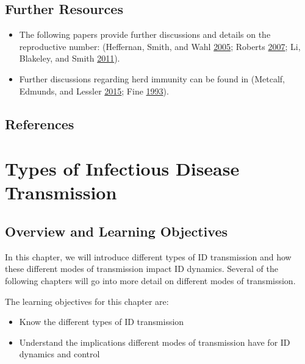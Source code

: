 \documentclass[]{book}
\providecommand{\tightlist}{%
  \setlength{\itemsep}{0pt}\setlength{\parskip}{0pt}}
\theoremstyle{definition}
\theoremstyle{definition}
\theoremstyle{definition}
\theoremstyle{remark}
\begin{document}
\hypertarget{further-resources-1}{%
\section{Further Resources}\label{further-resources-1}}

\begin{itemize}
\tightlist
\item
  The following papers provide further discussions and details on the
  reproductive number: (Heffernan, Smith, and Wahl
  \protect\hyperlink{ref-heffernan05}{2005}; Roberts
  \protect\hyperlink{ref-roberts07}{2007}; Li, Blakeley, and Smith
  \protect\hyperlink{ref-li11}{2011}).
\item
  Further discussions regarding herd immunity can be found in (Metcalf,
  Edmunds, and Lessler \protect\hyperlink{ref-metcalf15}{2015}; Fine
  \protect\hyperlink{ref-fine93}{1993}).
\end{itemize}

\hypertarget{references-1}{%
\section{References}\label{references-1}}

\hypertarget{types-of-infectious-disease-transmission}{%
\chapter{Types of Infectious Disease
Transmission}\label{types-of-infectious-disease-transmission}}

\hypertarget{overview-and-learning-objectives-4}{%
\section{Overview and Learning
Objectives}\label{overview-and-learning-objectives-4}}

In this chapter, we will introduce different types of ID transmission
and how these different modes of transmission impact ID dynamics.
Several of the following chapters will go into more detail on different
modes of transmission.

The learning objectives for this chapter are:

\begin{itemize}
\tightlist
\item
  Know the different types of ID transmission
\item
  Understand the implications different modes of transmission have for
  ID dynamics and control
\end{itemize}
\end{document}
